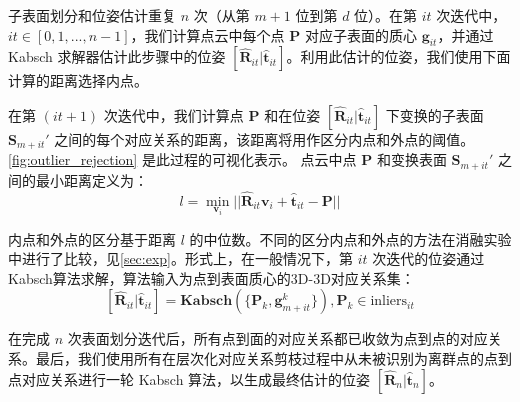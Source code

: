 子表面划分和位姿估计重复 $n$ 次（从第 $m + 1$ 位到第 $d$ 位）。在第 $it$ 次迭代中，$it \in [0,1,...,n-1]$，我们计算点云中每个点 $\mathbf{P}$ 对应子表面的质心 $\mathbf{g}_{it}$，并通过 Kabsch 求解器估计此步骤中的位姿 $[\hat{\mathbf{R}}_{it}|\hat{\mathbf{t}}_{it}]$。利用此估计的位姿，我们使用下面计算的距离选择内点。

在第 $(it+1)$ 次迭代中，我们计算点 $\mathbf{P}$ 和在位姿 $[\hat{\mathbf{R}}_{it}|\hat{\mathbf{t}}_{it}]$ 下变换的子表面 $\mathbf{S}_{m+it}'$ 之间的每个对应关系的距离，该距离将用作区分内点和外点的阈值。\autoref{fig:outlier_rejection} 是此过程的可视化表示。
点云中点 $\mathbf{P}$ 和变换表面 $\mathbf{S}_{m+it}'$ 之间的最小距离定义为：
\begin{equation}
\label{eq:l}
l = \min\limits_{\mathbf{v}_i} ||\hat{\mathbf{R}}_{it} \mathbf{v}_{i} + \hat{\mathbf{t}}_{it}-\mathbf{P}||
\end{equation}

内点和外点的区分基于距离 $l$ 的中位数。不同的区分内点和外点的方法在消融实验中进行了比较，见\autoref{sec:exp}。形式上，在一般情况下，第 $it$ 次迭代的位姿通过 Kabsch算法求解，算法输入为点到表面质心的3D-3D对应关系集：
\begin{equation}
    \label{eq:posekabsch}
    [\hat{\mathbf{R}}_{it}|\hat{\mathbf{t}}_{it}] = \mathbf{Kabsch}(\{\mathbf{P}_{k}, \mathbf{g}_{m+it}^{k}\}), {\mathbf{P}_{k}\in \text{inliers}_{it}}
\end{equation}

在完成 $n$ 次表面划分迭代后，所有点到面的对应关系都已收敛为点到点的对应关系。最后，我们使用所有在层次化对应关系剪枝过程中从未被识别为离群点的点到点对应关系进行一轮 Kabsch 算法，以生成最终估计的位姿 $[\hat{\mathbf{R}}_{n}|\hat{\mathbf{t}}_{n}]$。
